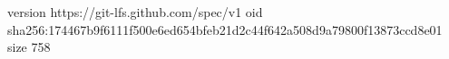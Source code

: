 version https://git-lfs.github.com/spec/v1
oid sha256:174467b9f6111f500e6ed654bfeb21d2c44f642a508d9a79800f13873ccd8e01
size 758
